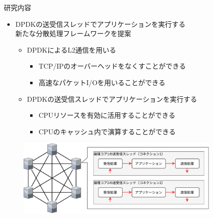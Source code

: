 \documentclass[12pt, unicode]{beamer}
\begin{document}
\begin{frame}{研究内容}
  \begin{itemize}
    \item DPDKの送受信スレッドでアプリケーションを実行する\\新たな分散処理フレームワークを提案
    \begin{itemize}
      \item DPDKによるL2通信を用いる
      \begin{itemize}
        \item TCP/IPのオーバーヘッドをなくすことができる
        \item 高速なパケットI/Oを用いることができる
      \end{itemize}
      \item DPDKの送受信スレッドでアプリケーションを実行する
      \begin{itemize}
        \item CPUリソースを有効に活用することができる
        \item CPUのキャッシュ内で演算することができる
      \end{itemize}
    \end{itemize}
  \end{itemize}

  \begin{figure}[h]
    \centering
    \includegraphics[width=0.9\textwidth]{pictures/Research.pdf}
  \end{figure}
\end{frame}
\end{document}
